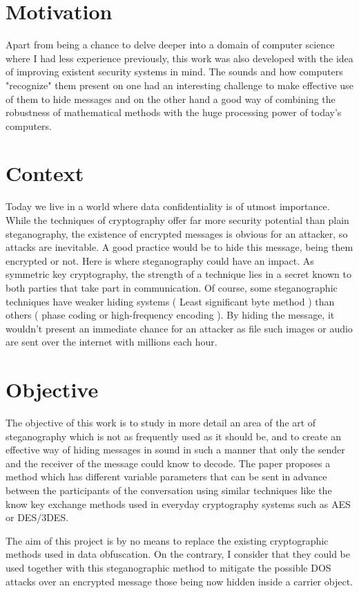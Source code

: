 \documentclass[12pt]{report}
\begin{document}
\section{Motivation}
Apart from being a chance to delve deeper into a domain of computer science where I had less experience previously, this work was also developed with the idea of improving existent security systems in mind. The sounds and how computers "recognize" them present on one had an interesting challenge to make effective use of them to hide messages and on the other hand a good way of combining the robustness of mathematical methods with the huge processing power of today's computers.
\section{Context}
Today we live in a world where data confidentiality is of utmost importance. While the techniques of cryptography offer far more security potential than plain steganography, the existence of encrypted messages is obvious for an attacker, so attacks are inevitable. A good practice would be to hide this message, being them encrypted or not. Here is where steganography could have an impact. As symmetric key cryptography, the strength of a technique lies in a secret known to both parties that take part in communication. Of course, some steganographic techniques have weaker hiding systems ( Least significant byte method ) than others ( phase coding or high-frequency encoding ). By hiding the message, it wouldn't present an immediate chance for an attacker as file such images or audio are sent over the internet with millions each hour.
\section{Objective}
The objective of this work is to study in more detail an area of the art of steganography which is not as frequently used as it should be, and to create an effective way of hiding messages in sound in such a manner that only the sender and the receiver of the message could know to decode. The paper proposes a method which has different variable parameters that can be sent in advance between the participants of the conversation using similar techniques like the know key exchange methods used in everyday cryptography systems such as AES or DES/3DES.

The aim of this project is by no means to replace the existing cryptographic methods used in data obfuscation. On the contrary, I consider that they could be used together with this steganographic method to mitigate the possible DOS attacks over an encrypted message those being now hidden inside a carrier object.
\end{document}
